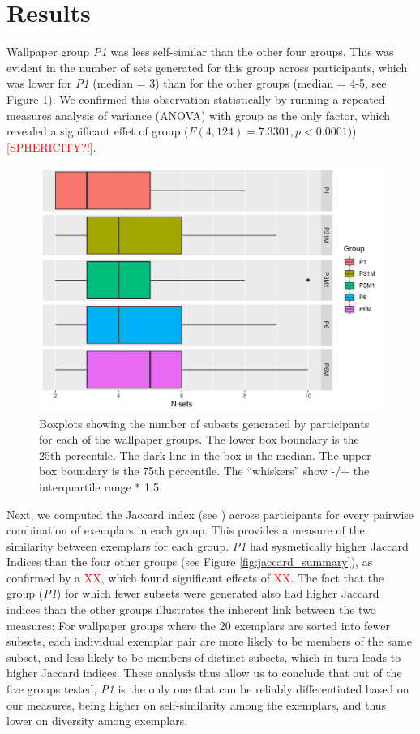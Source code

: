 \documentclass[11pt, twoside]{article}
\begin{document}
\section*{Results}
Wallpaper group \textit{P1} was less self-similar than the other four groups. This was evident in the number of sets generated for this group across participants, which was lower for \textit{P1} (median = 3) than for the other groups (median = 4-5, see Figure \ref{fig:n_sets_summary}). We confirmed this observation statistically by running a repeated measures analysis of variance (ANOVA) with group as the only factor, which revealed a significant effet of group ($F(4, 124) = 7.3301, p < 0.0001)$) \textcolor{red}{[SPHERICITY?!]}.
\begin{figure}[t]
	\centering
	\includegraphics[width=\linewidth]{./figures/nsets_summary.pdf}
	\caption{Boxplots showing the number of subsets generated by participants for each of the wallpaper groups. The lower box boundary is the 25th percentile. The dark line in the box is the median. The upper box boundary is the 75th percentile. The “whiskers” show -/+ the interquartile range * 1.5.}
	\label{fig:n_sets_summary}
\end{figure}
Next, we computed the Jaccard index (see ) across participants for every pairwise combination of exemplars in each group. This provides a measure of the similarity between exemplars for each group. \textit{P1} had sysmetically higher Jaccard Indices than the four other groups (see Figure \ref{fig:jaccard_summary}), as confirmed by a \textcolor{red}{XX}, which found significant effects of \textcolor{red}{XX}. The fact that the group (\textit{P1}) for which fewer subsets were generated also had higher Jaccard indices than the other groups illustrates the inherent link between the two measures: For wallpaper groups where the 20 exemplars are sorted into fewer subsets, each individual exemplar pair are more likely to be members of the same subset, and less likely to be members of distinct subsets, which in turn leads to higher Jaccard indices. These analysis thus allow us to conclude that out of the five groups tested, \textit{P1} is the only one that can be reliably differentiated based on our measures, being higher on self-similarity among the exemplars, and thus lower on diversity among exemplars. 
\end{document}
